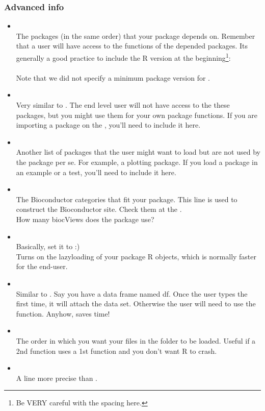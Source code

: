 \begin{frame}[allowframebreaks]
  \frametitle{Advanced info}
  \begin{itemize}
  \item {} \\ The packages (in the same order) that your package depends on. Remember that a user will have access to the functions of the depended packages. Its generally a good practice to include the R version at the beginning\footnote{Be VERY careful with the spacing here.}: \\  \\ Note that we did not specify a minimum package version for .
  \item {} \\ \alert{Very} similar to . The end level user will not have access to the these packages, but you might use them for your own package functions. If you are importing a package on the , you'll need to include it here.
  \item {} \\ Another list of packages that the user might want to load but are not used by the package per se. For example, a plotting package. If you load a package in an example or a test, you'll need to include it here.
  \item {} \\ The Bioconductor categories that fit your package. This line is used to construct the Bioconductor site. Check them at the . \\ How many biocViews does the  package use?
  \item {} \\ Basically, set it to  :) \\ Turns on the lazyloading of your package R objects, which is normally faster for the end-user.
  \item {} \\ Similar to . Say you have a data frame named \alert{df}. Once the user types  the first time, it will attach the data set. Otherwise the user will need to use the  function. Anyhow, saves time!
  \item {} \\ The order in which you want your  files in the  folder to be loaded. Useful if a 2nd function uses a 1st function and you don't want R to crash.
  \item {} \\ A line more precise than .
  \end{itemize}
\end{frame}

